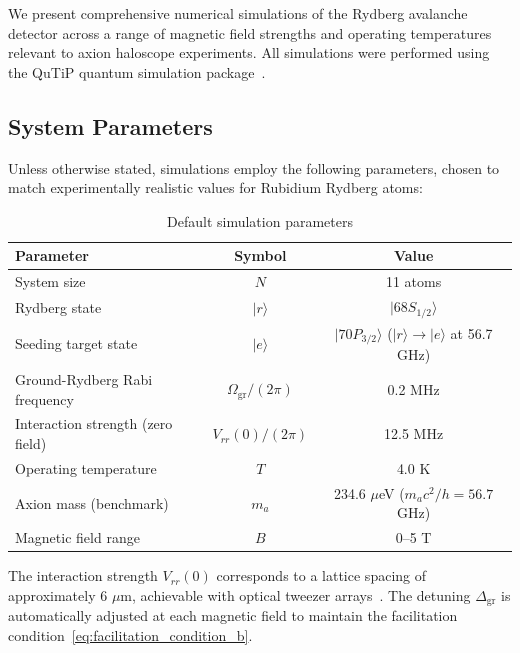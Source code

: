 We present comprehensive numerical simulations of the Rydberg avalanche detector across a range of magnetic field strengths and operating temperatures relevant to axion haloscope experiments. All simulations were performed using the QuTiP quantum simulation package~\cite{Johansson2013,qutip5}.

\subsection*{System Parameters}

Unless otherwise stated, simulations employ the following parameters, chosen to match experimentally realistic values for Rubidium Rydberg atoms:

\begin{table}[htbp]
\centering
\caption{Default simulation parameters}
\label{tab:simulation_params}
\begin{tabular}{lcc}
\hline\hline
Parameter & Symbol & Value \\
\hline
System size & $N$ & 11 atoms \\
Rydberg state & $|r\rangle$ & $|68S_{1/2}\rangle$ \\
Seeding target state & $|e\rangle$ & $|70P_{3/2}\rangle$ ($|r\rangle\!\to\!|e\rangle$ at 56.7 GHz) \\
Ground-Rydberg Rabi frequency & $\Omega_{\mathrm{gr}}/(2\pi)$ & 0.2 MHz \\
Interaction strength (zero field) & $V_{rr}(0)/(2\pi)$ & 12.5 MHz \\
Operating temperature & $T$ & 4.0 K \\
Axion mass (benchmark) & $m_a$ & 234.6 $\mu$eV ($m_a c^2/h = 56.7$ GHz) \\
Magnetic field range & $B$ & 0--5 T \\
\hline\hline
\end{tabular}
\end{table}

The interaction strength $V_{rr}(0)$ corresponds to a lattice spacing of approximately 6 $\mu$m, achievable with optical tweezer arrays~\cite{Barredo2018}. The detuning $\Delta_{\mathrm{gr}}$ is automatically adjusted at each magnetic field to maintain the facilitation condition~\eqref{eq:facilitation_condition_b}.

